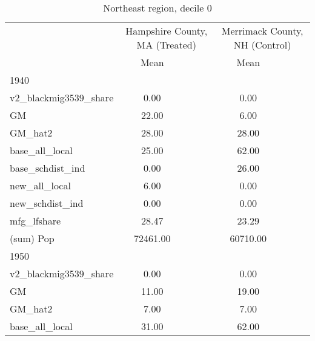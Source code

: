 \begin{table}[htbp]\centering
\def\sym#1{\ifmmode^{#1}\else\(^{#1}\)\fi}
\caption{Northeast region, decile 0 \label{tab1}}
\begin{tabular}{l*{2}{ccc}}
\toprule
                    &\multicolumn{3}{c}{Hampshire County, MA (Treated)}&\multicolumn{3}{c}{Merrimack County, NH (Control)}\\
                    &        Mean&            &            &        Mean&            &            \\
\midrule
1940                &            &            &            &            &            &            \\
v2\_blackmig3539\_share&        0.00&            &            &        0.00&            &            \\
GM                  &       22.00&            &            &        6.00&            &            \\
GM\_hat2             &       28.00&            &            &       28.00&            &            \\
base\_all\_local      &       25.00&            &            &       62.00&            &            \\
base\_schdist\_ind    &        0.00&            &            &       26.00&            &            \\
new\_all\_local       &        6.00&            &            &        0.00&            &            \\
new\_schdist\_ind     &        0.00&            &            &        0.00&            &            \\
mfg\_lfshare         &       28.47&            &            &       23.29&            &            \\
(sum) Pop           &    72461.00&            &            &    60710.00&            &            \\
\midrule
1950                &            &            &            &            &            &            \\
v2\_blackmig3539\_share&        0.00&            &            &        0.00&            &            \\
GM                  &       11.00&            &            &       19.00&            &            \\
GM\_hat2             &        7.00&            &            &        7.00&            &            \\
base\_all\_local      &       31.00&            &            &       62.00&            &            \\

\end{tabular}
\end{table}
